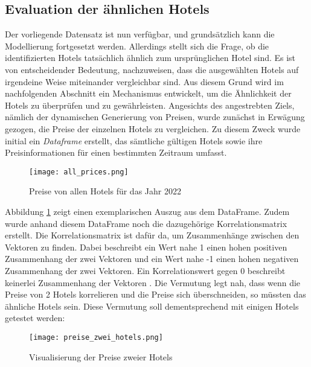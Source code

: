 \subsection{Evaluation der ähnlichen Hotels}
\label{subsec:Evaluation_1}
Der vorliegende Datensatz ist nun verfügbar, und grundsätzlich kann die Modellierung fortgesetzt werden. Allerdings stellt sich die Frage, ob die identifizierten Hotels tatsächlich ähnlich zum ursprünglichen Hotel sind. Es ist von entscheidender Bedeutung, nachzuweisen, dass die ausgewählten Hotels auf irgendeine Weise miteinander vergleichbar sind. Aus diesem Grund wird im nachfolgenden Abschnitt ein Mechanismus entwickelt, um die Ähnlichkeit der Hotels zu überprüfen und zu gewährleisten.
\newline
\newline
Angesichts des angestrebten Ziels, nämlich der dynamischen Generierung von Preisen, wurde zunächst in Erwägung gezogen, die Preise der einzelnen Hotels zu vergleichen. Zu diesem Zweck wurde initial ein \emph{Dataframe} erstellt, das sämtliche gültigen Hotels sowie ihre Preisinformationen für einen bestimmten Zeitraum umfasst.
\newpage
\begin{figure}[h]
    \centering
    \texttt{[image: all\_prices.png]}
    \caption[Preise von allen Hotels für das Jahr 2022]{Preise von allen Hotels für das Jahr 2022}
    \label{img:all_prices}
\end{figure}

Abbildung \ref{img:all_prices} zeigt einen exemplarischen Auszug aus dem DataFrame. Zudem wurde anhand diesem DataFrame noch die dazugehörige Korrelationsmatrix erstellt. Die Korrelationsmatrix ist dafür da, um Zusammenhänge zwischen den Vektoren zu finden. Dabei beschreibt ein Wert nahe 1 einen hohen positiven Zusammenhang der zwei Vektoren und ein Wert nahe -1 einen hohen negativen Zusammenhang der zwei Vektoren. Ein Korrelationswert gegen 0 beschreibt keinerlei Zusammenhang der Vektoren \cite{Team.03.05.2020}. Die Vermutung legt nah, dass wenn die Preise von 2 Hotels korrelieren und die Preise sich überschneiden, so müssten das ähnliche Hotels sein.
\newline
\newline
Diese Vermutung soll dementsprechend mit einigen Hotels getestet werden:
\begin{figure}[h]
    \centering
    \texttt{[image: preise\_zwei\_hotels.png]}
    \caption[Visualisierung der Preise zweier Hotels]{Visualisierung der Preise zweier Hotels}
    \label{img:preise_zwei_hotels}
\end{figure}

